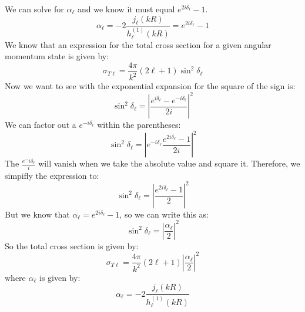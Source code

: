 \documentclass[12pt]{article}
\begin{document}
We can solve for $\alpha_{\ell}$ and we know it must equal $e^{2 i \delta_{\ell}}-1$.
\begin{equation}
\alpha_{\ell}=-2 \frac{j_{\ell}(k R)}{h_{\ell}^{(1)}(k R)} = e^{2 i \delta_{\ell}}-1
\end{equation}
We know that an expression for the total cross section for a given angular momentum state is given by:
\begin{equation}
  \sigma _{T \ell} = \frac{4 \pi}{k^2} (2 \ell + 1) \sin^2 \delta_{\ell}
\end{equation}
Now we want to see with the exponential expansion for the square of the sign is:
\begin{equation}
\sin^2 \delta_{\ell} = \left| \frac{e^{i \delta_{\ell}}-e^{- i \delta_{\ell}}}{2i} \right|^2
\end{equation}
We can factor out a $e^{-i \delta_{\ell}}$ within the parentheses:
\begin{equation}
\sin^2 \delta_{\ell} = \left| e^{-i \delta_{\ell}} \frac{e^{2i \delta_{\ell}}-1}{2i} \right|^2
\end{equation}
The $\frac{e^-i \delta_{\ell}}{i}$ will vanish when we take the absolute value and square it. Therefore, we simpifly the expression to:
\begin{equation}
\sin^2 \delta_{\ell} = \left| \frac{e^{2i \delta_{\ell}}-1}{2} \right|^2
\end{equation}
But we know that $\alpha_{\ell}=e^{2 i \delta_{\ell}}-1$, so we can write this as:
\begin{equation}
\sin^2 \delta_{\ell} = \left| \frac{\alpha_{\ell}}{2} \right|^2
\end{equation}
So the total cross section is given by:
\begin{equation}
\sigma _{T \ell} = \frac{4 \pi}{k^2} (2 \ell + 1) \left| \frac{\alpha_{\ell}}{2} \right|^2
\end{equation}
where $\alpha_{\ell}$ is given by:
\begin{equation}
\alpha_{\ell}=-2 \frac{j_{\ell}(k R)}{h_{\ell}^{(1)}(k R)}
\end{equation}
\end{document}
